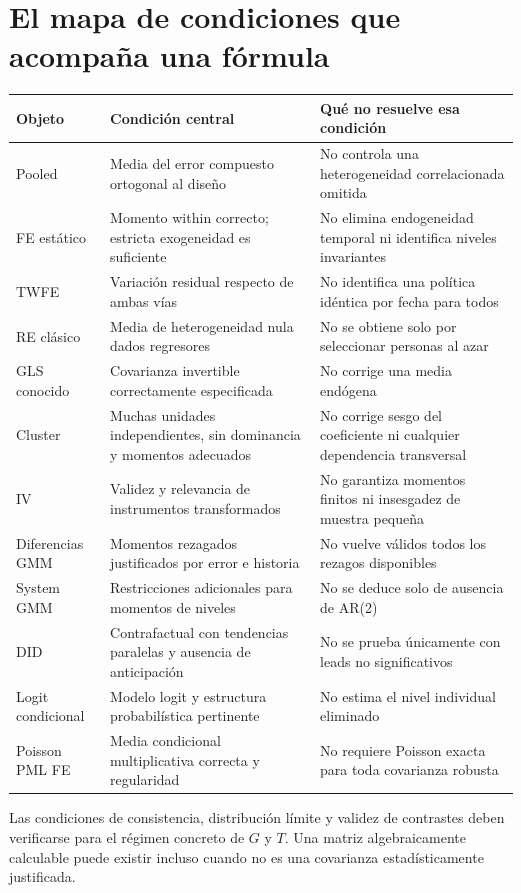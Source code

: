\documentclass[11pt,a4paper]{article}
\theoremstyle{definition}
\begin{document}
\section{El mapa de condiciones que acompaña una fórmula}
\begin{center}\small
\begin{tabular}{>{\raggedright\arraybackslash}p{2.5cm}>{\raggedright\arraybackslash}p{5.4cm}>{\raggedright\arraybackslash}p{7.0cm}}
\toprule
Objeto & Condición central & Qué no resuelve esa condición\\
\midrule
Pooled & Media del error compuesto ortogonal al diseño & No controla una heterogeneidad correlacionada omitida\\
FE estático & Momento within correcto; estricta exogeneidad es suficiente & No elimina endogeneidad temporal ni identifica niveles invariantes\\
TWFE & Variación residual respecto de ambas vías & No identifica una política idéntica por fecha para todos\\
RE clásico & Media de heterogeneidad nula dados regresores & No se obtiene solo por seleccionar personas al azar\\
GLS conocido & Covarianza invertible correctamente especificada & No corrige una media endógena\\
Cluster & Muchas unidades independientes, sin dominancia y momentos adecuados & No corrige sesgo del coeficiente ni cualquier dependencia transversal\\
IV & Validez y relevancia de instrumentos transformados & No garantiza momentos finitos ni insesgadez de muestra pequeña\\
Diferencias GMM & Momentos rezagados justificados por error e historia & No vuelve válidos todos los rezagos disponibles\\
System GMM & Restricciones adicionales para momentos de niveles & No se deduce solo de ausencia de AR(2)\\
DID & Contrafactual con tendencias paralelas y ausencia de anticipación & No se prueba únicamente con leads no significativos\\
Logit condicional & Modelo logit y estructura probabilística pertinente & No estima el nivel individual eliminado\\
Poisson PML FE & Media condicional multiplicativa correcta y regularidad & No requiere Poisson exacta para toda covarianza robusta\\
\bottomrule
\end{tabular}
\end{center}
Las condiciones de consistencia, distribución límite y validez de contrastes deben verificarse para el régimen concreto de $G$ y $T$. Una matriz algebraicamente calculable puede existir incluso cuando no es una covarianza estadísticamente justificada.
\end{document}
